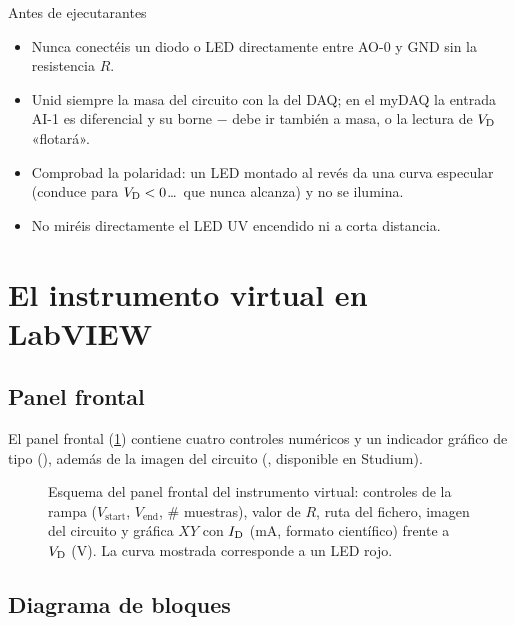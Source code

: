 \documentclass[11pt,a4paper]{article}
\begin{document}
\begin{precaucion}{Antes de ejecutar}{antes}
  \begin{itemize}[leftmargin=1.2em]
    \item Nunca conectéis un diodo o LED directamente entre AO-0 y GND sin la
      resistencia $R$.
    \item Unid siempre la masa del circuito con la del DAQ; en el myDAQ la
      entrada AI-1 es diferencial y su borne $-$ debe ir también a masa, o la
      lectura de $V_{\mathrm D}$ «flotará».
    \item Comprobad la polaridad: un LED montado al revés da una curva
      especular (conduce para $V_{\mathrm D}<0$\ldots\ que nunca alcanza) y no se ilumina.
    \item No miréis directamente el LED UV encendido ni a corta distancia.
  \end{itemize}
\end{precaucion}

\section{El instrumento virtual en LabVIEW}
\label{sec:labview}

\subsection{Panel frontal}

El panel frontal (\cref{fig:panel}) contiene cuatro controles numéricos y un
indicador gráfico de tipo 
(), además de la imagen
del circuito (, disponible en Studium).

\begin{figure}[htbp]
  \centering
  
  \caption{Esquema del panel frontal del instrumento virtual: controles de la
  rampa ($V_{\text{start}}$, $V_{\text{end}}$, \# muestras), valor de $R$,
  ruta del fichero, imagen del circuito y gráfica $XY$ con $I_{\mathrm D}$ (mA, formato
  científico) frente a $V_{\mathrm D}$ (V). La curva mostrada corresponde a un LED rojo.}
  \label{fig:panel}
\end{figure}

\subsection{Diagrama de bloques}
\end{document}
